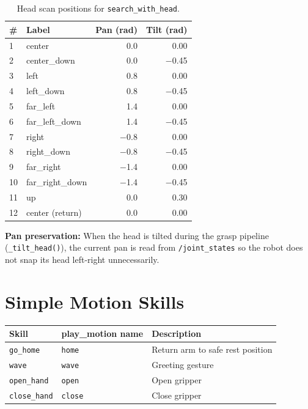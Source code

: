\documentclass[12pt,a4paper]{report}
\begin{document}
\begin{table}[H]
\centering
\caption{Head scan positions for \texttt{search\_with\_head}.}
\label{tab:head_positions}
\begin{tabular}{llrr}
\toprule
\textbf{\#} & \textbf{Label} & \textbf{Pan (rad)} & \textbf{Tilt (rad)} \\
\midrule
1  & center         &  0.0 &  0.00 \\
2  & center\_down   &  0.0 & $-$0.45 \\
3  & left           &  0.8 &  0.00 \\
4  & left\_down     &  0.8 & $-$0.45 \\
5  & far\_left      &  1.4 &  0.00 \\
6  & far\_left\_down&  1.4 & $-$0.45 \\
7  & right          & $-$0.8 &  0.00 \\
8  & right\_down    & $-$0.8 & $-$0.45 \\
9  & far\_right     & $-$1.4 &  0.00 \\
10 & far\_right\_down& $-$1.4 & $-$0.45 \\
11 & up             &  0.0 &  0.30 \\
12 & center (return)&  0.0 &  0.00 \\
\bottomrule
\end{tabular}
\end{table}

\textbf{Pan preservation:} When the head is tilted during the grasp pipeline
(\texttt{\_tilt\_head()}), the current pan is read from \texttt{/joint\_states}
so the robot does not snap its head left-right unnecessarily.

\section{Simple Motion Skills}

\begin{center}
\begin{tabular}{lll}
\toprule
\textbf{Skill} & \textbf{play\_motion name} & \textbf{Description} \\
\midrule
\texttt{go\_home}    & \texttt{home}  & Return arm to safe rest position \\
\texttt{wave}        & \texttt{wave}  & Greeting gesture \\
\texttt{open\_hand}  & \texttt{open}  & Open gripper \\
\texttt{close\_hand} & \texttt{close} & Close gripper \\
\bottomrule
\end{tabular}
\end{center}
\end{document}
